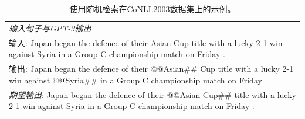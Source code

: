 \documentclass[supercite]{Experimental_Report}
\theoremstyle{definition}
\begin{document}
\begin{table}[th!]
{\begin{tabular}{l}
\textit{输入句子与GPT-3输出} \\
输入: Japan began the defence of their Asian Cup title with a lucky 2-1 win against Syria in a Group C championship match on Friday . \\
输出: Japan began the defence of their @@Asian\#\# Cup title with a lucky 2-1 win against @@Syria\#\# in a Group C championship match on Friday . \\
{\color{blue}\it 期望输出}: Japan began the defence of their @@Asian Cup\#\# title with a lucky 2-1 win against Syria in a Group C championship match on Friday . \\\bottomrule
    \end{tabular}
    }
     \caption{使用随机检索在CoNLL2003数据集上的示例。}
    \label{tab:example_random_retrieval_embedding}
\end{table}
\end{document}
